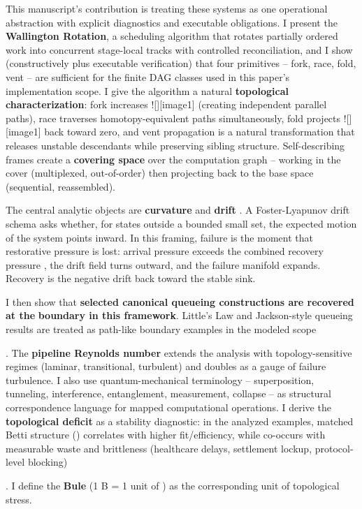\documentclass[
]{article}
\begin{document}
This manuscript's contribution is treating these systems as one
operational abstraction with explicit diagnostics and executable
obligations. I present the \textbf{Wallington Rotation}, a scheduling
algorithm that rotates partially ordered work into concurrent
stage-local tracks with controlled reconciliation, and I show
(constructively plus executable verification) that four primitives --
fork, race, fold, vent -- are sufficient for the finite DAG classes used
in this paper's implementation scope. I give the algorithm a natural
\textbf{topological characterization}: fork increases
!{[}{]}{[}image1{]} (creating independent parallel paths), race
traverses homotopy-equivalent paths simultaneously, fold projects
!{[}{]}{[}image1{]} back toward zero, and vent propagation is a natural
transformation that releases unstable descendants while preserving
sibling structure. Self-describing frames create a \textbf{covering
space} over the computation graph -- working in the cover (multiplexed,
out-of-order) then projecting back to the base space (sequential,
reassembled).

The central analytic objects are \textbf{curvature} and \textbf{drift} .
A Foster-Lyapunov drift schema asks whether, for states outside a
bounded small set, the expected motion of the system points inward. In
this framing, failure is the moment that restorative pressure is lost:
arrival pressure exceeds the combined recovery pressure , the drift
field turns outward, and the failure manifold expands. Recovery is the
negative drift back toward the stable sink.

I then show that \textbf{selected canonical queueing constructions are
recovered at the} \textbf{boundary in this framework}. Little's Law and
Jackson-style queueing results are treated as path-like boundary
examples in the modeled scope

. The \textbf{pipeline Reynolds number} extends the analysis with
topology-sensitive regimes (laminar, transitional, turbulent) and
doubles as a gauge of failure turbulence. I also use quantum-mechanical
terminology -- superposition, tunneling, interference, entanglement,
measurement, collapse -- as structural correspondence language for
mapped computational operations. I derive the \textbf{topological
deficit} as a stability diagnostic: in the analyzed examples, matched
Betti structure () correlates with higher fit/efficiency, while
co-occurs with measurable waste and brittleness (healthcare delays,
settlement lockup, protocol-level blocking)

. I define the \textbf{Bule} (1 B = 1 unit of ) as the corresponding
unit of topological stress.
\end{document}
